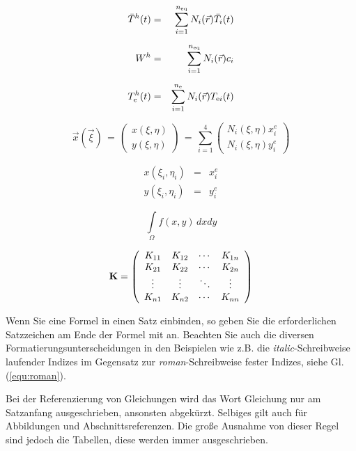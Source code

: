\begin{eqnarray}
\bar{T}^h(t) &=& \sum_{i=1}^{n_{\rm eq}}
N_i(\vec{r})\bar{T}_i(t)\\[2mm]
W^h &=& \sum_{i=1}^{n_{\rm eq}} N_i(\vec{r})c_i\\[2mm]
T_{\rm e}^h(t) &=& \sum_{i=1}^{n_{\rm e}} N_i(\vec{r})T_{{\rm e}i}(t)
\label{equ:roman}
\end{eqnarray}

\begin{equation}
\vec{x}\left(\vec{\xi}\right)\,=\,
\left( \begin{array}{c}
x(\xi,\eta)\\
y(\xi,\eta) \end{array} \right)
\,=\,\sum_{i=1}^{4}
\left( \begin{array}{c}
N_i(\xi,\eta)x_i^e \\
N_i(\xi,\eta)y_i^e \end{array} \right)
\label{equ:gllokKoord}
\end{equation}

\begin{eqnarray}
 x(\xi_i,\eta_i)&=&x_i^e \nonumber\\
 y(\xi_i,\eta_i)&=&y_i^e
\end{eqnarray}

\begin{equation}
\int\limits_{\Omega} f(x,y)\,dxdy
\label{equ:IntvTrans}
\end{equation}

\begin{equation}
{\bf K}=\left(
\begin{array}{c c c c}
K_{11} & K_{12} & \cdots & K_{1n} \\
K_{21} & K_{22} & \cdots & K_{2n} \\
\vdots & \vdots & \ddots & \vdots \\
K_{n1} & K_{n2} & \cdots & K_{nn} 
\end{array}
\right)
\end{equation}


Wenn Sie eine Formel in einen Satz einbinden, so geben
Sie die erforderlichen Satzzeichen am Ende der Formel mit an.  Beachten Sie
auch die diversen Formatierungsunterscheidungen in den Beispielen wie z.B.
die {\it italic}-Schreibweise laufender Indizes im Gegensatz zur
{\it roman}-Schreibweise fester Indizes, siehe Gl. (\ref{equ:roman}).

Bei der Referenzierung von Gleichungen wird das Wort Gleichung nur am
Satzanfang ausgeschrieben, ansonsten abgekürzt.  Selbiges gilt auch für
Abbildungen und Abschnittsreferenzen.  Die große Ausnahme von dieser Regel
sind jedoch die Tabellen, diese werden immer ausgeschrieben.


